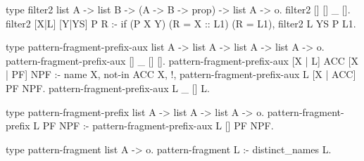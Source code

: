\begin{elpicode}
type filter2 list A -> list B -> (A -> B -> prop) -> list A -> o.
filter2 [] []   _ [].
filter2 [X|L] [Y|YS] P R :- if (P X Y) (R = X :: L1) (R = L1), filter2 L YS P L1.

type pattern-fragment-prefix-aux list A -> list A -> list A -> list A -> o.
pattern-fragment-prefix-aux [] _ [] [].
pattern-fragment-prefix-aux [X | L] ACC [X | PF] NPF :- name X, not-in ACC X, !, 
  pattern-fragment-prefix-aux L [X | ACC] PF NPF.
pattern-fragment-prefix-aux L _ [] L.

type pattern-fragment-prefix list A -> list A -> list A -> o.
pattern-fragment-prefix L PF NPF :- pattern-fragment-prefix-aux L [] PF NPF.

type pattern-fragment list A -> o.
pattern-fragment L :- distinct_names L.
\end{elpicode}
